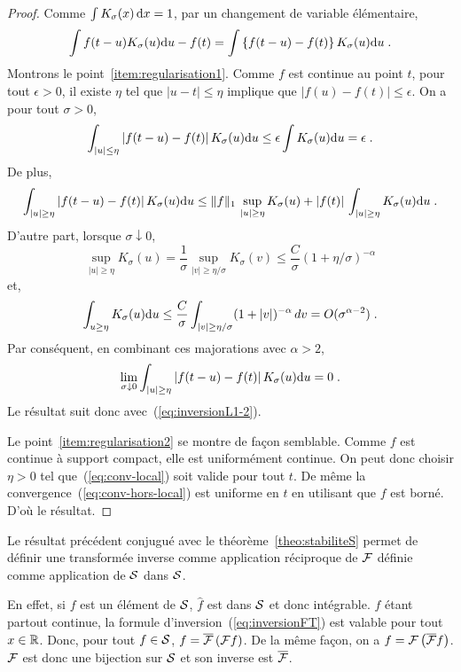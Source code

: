 \begin{proof}
Comme $\int K_\sigma(x)\, \mathrm{d} x= 1$, par un changement de variable {\'e}l{\'e}mentaire,
\begin{equation}
\label{eq:inversionL1-2}
\int f(t-u) K_\sigma(u) \mathrm{d} u - f(t) = \int \left\{ f(t - u) - f(t)  \right\} K_\sigma(u) \mathrm{d} u \;.
\end{equation}
Montrons le point~\ref{item:regularisation1}.
Comme $f$ est continue au point $t$, pour tout $\epsilon > 0$, il existe $\eta$ tel que $|u-t| \leq \eta$
implique que $|f(u) - f(t) | \leq \epsilon$. On a pour tout $\sigma > 0$,
\begin{equation}
\label{eq:conv-local}
\int_{|u| \leq \eta} \left|  f(t-u) - f(t) \right| K_\sigma(u) \mathrm{d} u \leq \epsilon \int K_\sigma(u) \mathrm{d} u = \epsilon \;.
\end{equation}
De plus,
$$
\int_{|u| \geq \eta} \left| f(t-u) - f(t) \right| K_\sigma(u) \mathrm{d} u  \leq \|f\|_1\,\sup_{|u|\geq\eta} {K}_\sigma(u)
+|f(t)|\,\int_{|u|\geq \eta} {K}_\sigma(u) \mathrm{d} u  \;.
$$
D'autre part, lorsque $\sigma \downarrow 0$,
$$
\sup_{|u|\geq\eta} {K}_\sigma(u) = \frac1\sigma \sup_{|v|\geq\eta/\sigma} {K}_\sigma(v)\leq  \frac{C}\sigma (1+\eta/\sigma)^{-\alpha}
$$
et,
$$
\int_{u\geq \eta} K_\sigma(u) \mathrm{d} u \leq \frac{C}\sigma\int_{|v|\geq\eta/\sigma} (1+|v|)^{-\alpha}\,dv =O(\sigma^{\alpha-2})\;.
$$
Par cons{\'e}quent, en combinant ces majorations avec $\alpha>2$,
\begin{equation}
\label{eq:conv-hors-local}
\lim_{\sigma \downarrow 0} \int_{|u| \geq \eta} \left|  f(t-u) - f(t) \right| K_\sigma(u) \mathrm{d} u =0 \;.
\end{equation}
Le r{\'e}sultat suit donc avec~(\ref{eq:inversionL1-2}).

Le point~\ref{item:regularisation2} se montre de fa\c{c}on semblable.
Comme $f$ est continue {\`a} support compact, elle est uniform{\'e}ment continue.
On peut donc choisir $\eta>0$ tel que~(\ref{eq:conv-local}) soit valide pour
tout $t$. De m{\^e}me la convergence~(\ref{eq:conv-hors-local}) est uniforme en $t$
en utilisant que $f$ est born{\'e}. D'o{\`u} le r{\'e}sultat.
\end{proof}



Le r{\'e}sultat pr{\'e}c{\'e}dent conjugu{\'e} avec le th{\'e}or{\`e}me~\ref{theo:stabiliteS} permet de
d{\'e}finir une transform{\'e}e inverse comme application r{\'e}ciproque de $\mathcal{F}$ d{\'e}finie
comme application de $\mathcal{S}$ dans $\mathcal{S}$.

En effet, si $f$ est un {\'e}l{\'e}ment de $\mathcal{S}$, $\hat{f}$ est dans $\mathcal{S}$ et donc
int{\'e}grable. $f$ {\'e}tant partout continue, la formule
d'inversion~(\ref{eq:inversionFT}) est valable pour tout $x \in \mathbb{R}$. Donc,
pour tout $f \in \mathcal{S}$, $f = \overline{\mathcal{F}}\left( \mathcal{F} f \right)$. De la m{\^e}me fa\c{c}on, on a $f =
\mathcal{F}\left( \overline{\mathcal{F}} f \right)$. $\mathcal{F}$ est donc une bijection sur $\mathcal{S}$ et son inverse est
$\overline{\mathcal{F}}$.

